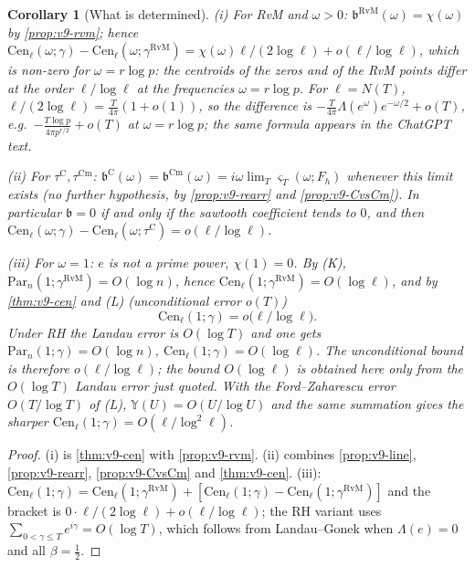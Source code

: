 \documentclass[11pt,a4paper]{article}
\numberwithin{equation}{section}
\newtheorem{corollary}[theorem]{Corollary}
\theoremstyle{definition}
\theoremstyle{remark}
\newcommand{\Cm}{\mathrm{Cm}}
\begin{document}
\begin{corollary}[What is determined]\label{cor:v9-cen}
(i) For RvM and $\omega>0$: $\mathfrak b^{\mathrm{RvM}}(\omega)=\chi(\omega)$ by \cref{prop:v9-rvm}; hence $\mathrm{Cen}_\ell(\omega;\gamma)-\mathrm{Cen}_\ell(\omega;\gamma^{\mathrm{RvM}})=\chi(\omega)\ell/(2\log\ell)+o(\ell/\log\ell)$, which is non-zero for $\omega=r\log p$: the centroids of the zeros and of the RvM points differ at the order $\ell/\log\ell$ at the frequencies $\omega=r\log p$. For $\ell=N(T)$, $\ell/(2\log\ell)=\frac T{4\pi}(1+o(1))$, so the difference is $-\frac{T}{4\pi}\Lambda(e^\omega)e^{-\omega/2}+o(T)$, e.g.\ $-\frac{T\log p}{4\pi p^{r/2}}+o(T)$ at $\omega=r\log p$; the same formula appears in the ChatGPT text.

(ii) For $\tau^{\mathrm C},\tau^{\Cm}$: $\mathfrak b^{\mathrm C}(\omega)=\mathfrak b^{\Cm}(\omega)=i\omega\lim_T\varsigma_T(\omega;F_h)$ whenever this limit exists (no further hypothesis, by \cref{prop:v9-rearr} and \cref{prop:v9-CvsCm}). In particular $\mathfrak b=0$ if and only if the sawtooth coefficient tends to $0$, and then $\mathrm{Cen}_\ell(\omega;\gamma)-\mathrm{Cen}_\ell(\omega;\tau^{\mathrm C})=o(\ell/\log\ell)$.

(iii) For $\omega=1$: $e$ is not a prime power, $\chi(1)=0$. By (K), $\mathrm{Par}_n(1;\gamma^{\mathrm{RvM}})=O(\log n)$, hence $\mathrm{Cen}_\ell(1;\gamma^{\mathrm{RvM}})=O(\log\ell)$, and by \cref{thm:v9-cen} and (L) (unconditional error $o(T)$)
\begin{equation}
\mathrm{Cen}_\ell(1;\gamma)=o\bigl(\ell/\log\ell\bigr).
\end{equation}
Under RH the Landau error is $O(\log T)$ and one gets $\mathrm{Par}_n(1;\gamma)=O(\log n)$, $\mathrm{Cen}_\ell(1;\gamma)=O(\log\ell)$. The unconditional bound is therefore $o(\ell/\log\ell)$; the bound $O(\log\ell)$ is obtained here only from the $O(\log T)$ Landau error just quoted. With the Ford--Zaharescu error $O(T/\log T)$ of (L), $\mathbb Y(U)=O(U/\log U)$ and the same summation gives the sharper $\mathrm{Cen}_\ell(1;\gamma)=O(\ell/\log^2\ell)$.
\end{corollary}
\begin{proof}
(i) is \cref{thm:v9-cen} with \cref{prop:v9-rvm}. (ii) combines \cref{prop:v9-line}, \cref{prop:v9-rearr}, \cref{prop:v9-CvsCm} and \cref{thm:v9-cen}. (iii): $\mathrm{Cen}_\ell(1;\gamma)=\mathrm{Cen}_\ell(1;\gamma^{\mathrm{RvM}})+[\mathrm{Cen}_\ell(1;\gamma)-\mathrm{Cen}_\ell(1;\gamma^{\mathrm{RvM}})]$ and the bracket is $0\cdot\ell/(2\log\ell)+o(\ell/\log\ell)$; the RH variant uses $\sum_{0<\gamma\le T}e^{i\gamma}=O(\log T)$, which follows from Landau--Gonek when $\Lambda(e)=0$ and all $\beta=\frac12$.
\end{proof}
\end{document}
